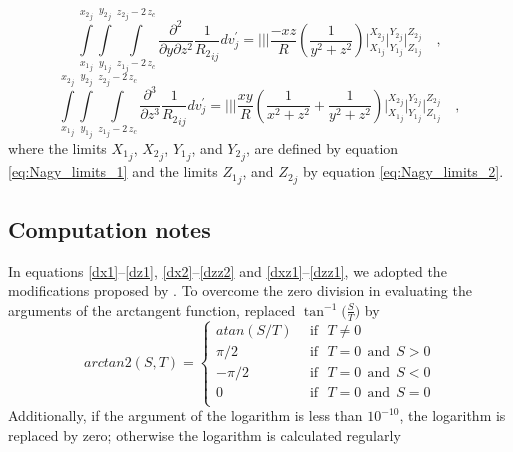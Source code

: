 \documentclass[journal abbreviation, manuscript]{copernicus}
\begin{document}
\begin{equation}
\int\limits_{{x_{1}}_{j}}^{{x_{2}}_{j}} \int\limits_{{y_{1}}_{j}}^{{y_{2}}_{j}} \int\limits_{{z_{1}}_{j} - 2 \, z_c}^{{z_{2}}_{j} - 2 \, z_c}
\frac{\partial^{2}  }{\partial y \partial z^{2}} {\frac{1}{{R_2}_{ij}}} dv_{j}^{\prime} =
\Bigg|\Bigg|\Bigg|
\frac{- x z}{R} 
\left( \frac{1}{y^{2} + z^{2}} \right)
\Bigg|_{{X_1}_{j}}^{{X_2}_{j}} \Bigg|_{{Y_1}_{j}}^{{Y_2}_{j}} \Bigg|_{{Z_1}_{j}}^{{Z_2}_{j}} \quad ,
\label{syzz}
\end{equation}
\begin{equation}
\int\limits_{{x_{1}}_{j}}^{{x_{2}}_{j}} \int\limits_{{y_{1}}_{j}}^{{y_{2}}_{j}} \int\limits_{{z_{1}}_{j} - 2 \, z_c}^{{z_{2}}_{j} - 2 \, z_c}
\frac{\partial^{3}  }{\partial z^{3}} {\frac{1}{{R_2}_{ij}}} dv_{j}^{\prime} =
\Bigg|\Bigg|\Bigg|
\frac{ x y}{R} 
\left( \frac{1}{x^{2} + z^{2}} + \frac{1}{y^{2} + z^{2}} \right)
\Bigg|_{{X_1}_{j}}^{{X_2}_{j}} \Bigg|_{{Y_1}_{j}}^{{Y_2}_{j}} \Bigg|_{{Z_1}_{j}}^{{Z_2}_{j}} \quad ,
\label{sz3}
\end{equation}
where the limits ${X_1}_{j}$, ${X_2}_{j}$, ${Y_1}_{j}$, and ${Y_2}_{j}$, are defined 
by equation \ref{eq:Nagy_limits_1} and the limits ${Z_1}_{j}$, and ${Z_2}_{j}$ by
equation \ref{eq:Nagy_limits_2}.

\subsection{Computation notes}

In equations \ref{dx1}--\ref{dz1}, \ref{dx2}--\ref{dzz2} and \ref{dxz1}--\ref{dzz1}, we adopted the modifications proposed by \cite{Fukushima2020}.
To overcome the zero division in evaluating the arguments of the arctangent function, \cite{Fukushima2020} replaced  $\tan^{-1} \big( \frac{S}{T} \big)$ by 
\begin{equation}
arctan2(S,T) = \begin{cases}
    atan (S/T) & \:\: \mbox{if} \: \:\:  T \neq 0 \\
    \pi /2 & \:\: \mbox{if} \: \:\:  T = 0  \: \: \mbox{and} \: \:S > 0 \\
    -\pi /2 & \:\: \mbox{if} \: \:\:  T = 0  \: \: \mbox{and} \: \:S < 0 \\
    0 & \:\: \mbox{if} \: \:\:  T = 0  \: \: \mbox{and} \: \:S = 0 \\
    \end{cases}
\label{eq:arctan2}  
\end{equation}
Additionally, if the argument of the logarithm is less than $10^{-10}$, the logarithm is replaced by zero; otherwise the logarithm is  calculated regularly
\end{document}
